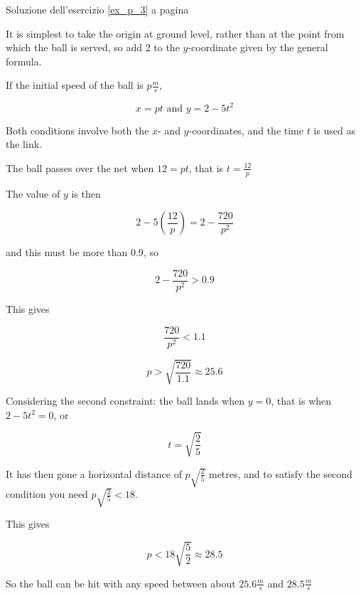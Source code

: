Soluzione dell'esercizio \ref{ex_p_3} a pagina \pageref{ex_p_3}\label{sol_p_3}


It is simplest to take the origin at ground level, rather than at the point
from which the ball is served, so add 2 to the $y$-coordinate given by the
general formula. 

If the initial speed of the ball is $p\frac{m}{s}$,


\begin{equation*}
x = pt \textrm{ and }y = 2 - 5t^2
\end{equation*}

Both conditions involve both the $x$- and $y$-coordinates, and the time $t$ is
used as the link.

The ball passes over the net when $12 = pt$, that is $t=\frac{12}{p}$

The value of $y$ is then

\begin{equation*}
2-5\left(
\frac{12}{p}
\right)=2-\frac{720}{p^2}
\end{equation*}

and this must be more than $0.9$, so 

\begin{equation*}
2-\frac{720}{p^2} > 0.9
\end{equation*}

This gives

\begin{equation*}
\frac{720}{p^2} <1.1
\end{equation*}


\begin{equation*}
p>\sqrt{\frac{720}{1.1}}\approx25.6
\end{equation*}

Considering the second constraint: the ball lands when $y = 0$, that is when 
$2 - 5t^2 = 0$, or 


\begin{equation*}
t=\sqrt{\frac{2}{5}}
\end{equation*}

It has then gone a horizontal distance of $p\sqrt{\frac{2}{5}}$
metres, and to satisfy the second condition you need $p\sqrt{\frac{2}{5}} < 18$.

This gives 



\begin{equation*}
p<18\sqrt{\frac{5}{2}}\approx 28.5
\end{equation*}


So the ball can be hit with any speed between about $25.6 \frac{m}{s}$
and
$28.5\frac{m}{s}$

